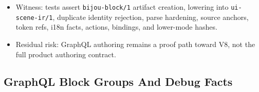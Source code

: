 \begin{itemize}
\item
  Witness: tests assert \texttt{b\allowbreak{}i\allowbreak{}j\allowbreak{}o\allowbreak{}u\allowbreak{}-\allowbreak{}b\allowbreak{}l\allowbreak{}o\allowbreak{}c\allowbreak{}k\allowbreak{}/\allowbreak{}1} artifact creation, lowering into \texttt{u\allowbreak{}i\allowbreak{}-\allowbreak{}s\allowbreak{}c\allowbreak{}e\allowbreak{}n\allowbreak{}e\allowbreak{}-\allowbreak{}i\allowbreak{}r\allowbreak{}/\allowbreak{}1}, duplicate identity rejection, parse hardening, source anchors, token refs, i18n facts, actions, bindings, and lower-mode hashes.
\item
  Residual risk: GraphQL authoring remains a proof path toward V8, not the full product authoring contract.
\end{itemize}

\subsection{GraphQL Block Groups And Debug Facts}\label{record-260-graphql-block-groups-and-debug-facts}

